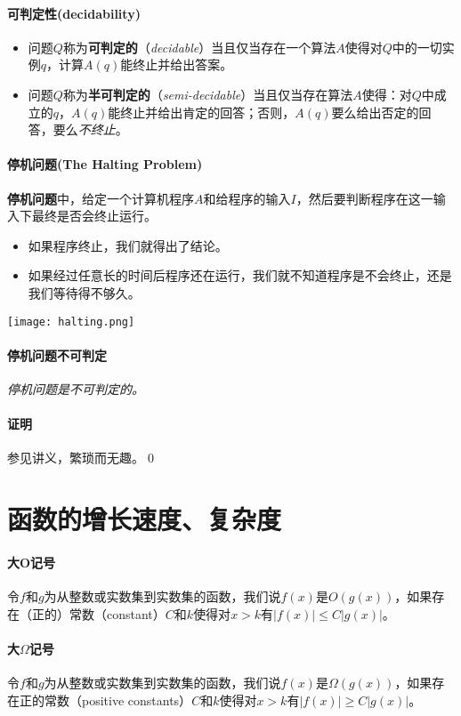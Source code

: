 \documentclass[b5paper,oneside]{ctexbook}
\begin{document}
\paragraph{可判定性(decidability)}
\begin{itemize}
  \item  问题$Q$称为\textbf{可判定的}（\emph{decidable}）当且仅当存在一个算法$A$使得对$Q$中的一切实例$q$，计算$A(q)$能终止并给出答案。
 \item  问题$Q$称为\textbf{半可判定的}（\emph{semi-decidable}）当且仅当存在算法$A$使得：对$Q$中成立的$q$，$A(q)$能终止并给出肯定的回答；否则，$A(q)$要么给出否定的回答，要么\textit{不终止}。
\end{itemize}
\paragraph{停机问题(The Halting Problem)}\textbf{停机问题}中，给定一个计算机程序$A$和给程序的输入$I$，然后要判断程序在这一输入下最终是否会终止运行。
\begin{itemize}
\item 如果程序终止，我们就得出了结论。
\item 如果经过任意长的时间后程序还在运行，我们就不知道程序是不会终止，还是我们等待得不够久。
\end{itemize}
\begin{center}
\texttt{[image: halting.png]}
\end{center}
\paragraph{停机问题不可判定}\textit{停机问题是不可判定的。}
\paragraph{证明}参见讲义，繁琐而无趣。\hfill\qed
\section{函数的增长速度、复杂度}
\paragraph{大O记号}令$f$和$g$为从整数或实数集到实数集的函数，我们说$f (x)$是$O(g(x))$，如果存在（正的）常数（constant）$C$和$k$使得对$x > k$有$|f (x)| \le C|g(x)|$。
\paragraph{大$\Omega$记号}令$f$和$g$为从整数或实数集到实数集的函数，我们说$f (x)$是$\Omega(g(x))$，如果存在正的常数（positive constants）$C$和$k$使得对$x > k$有$|f (x)| \ge C|g(x)|$。
\end{document}
